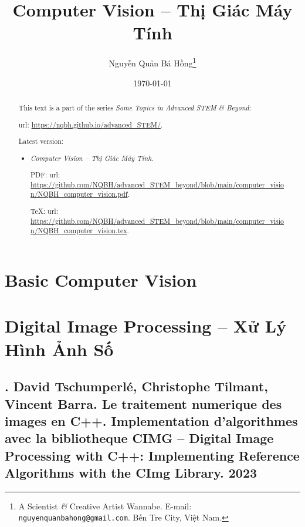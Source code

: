 \documentclass{article}
\title{Computer Vision -- Thị Giác Máy Tính}
\author{Nguyễn Quản Bá Hồng\footnote{A Scientist {\it\&} Creative Artist Wannabe. E-mail: {\tt nguyenquanbahong@gmail.com}. Bến Tre City, Việt Nam.}}
\date{\today}
\begin{document}
\maketitle
\begin{abstract}
	This text is a part of the series {\it Some Topics in Advanced STEM \& Beyond}:
	
	{\sc url}: \url{https://nqbh.github.io/advanced_STEM/}.
	
	Latest version:
	\begin{itemize}
		\item {\it Computer Vision -- Thị Giác Máy Tính}.
		
		PDF: {\sc url}: \url{https://github.com/NQBH/advanced_STEM_beyond/blob/main/computer_vision/NQBH_computer_vision.pdf}.
		
		\TeX: {\sc url}: \url{https://github.com/NQBH/advanced_STEM_beyond/blob/main/computer_vision/NQBH_computer_vision.tex}.
	\end{itemize}
\end{abstract}
\tableofcontents


\section{Basic Computer Vision}


\section{Digital Image Processing -- Xử Lý Hình Ảnh Số}

\subsection{\cite{Tschumperle_Tilmant_Barra2023}. {\sc David Tschumperl\'e, Christophe Tilmant, Vincent Barra}. Le traitement numerique des images en C++. Implementation d'algorithmes avec la bibliotheque CIMG -- Digital Image Processing with C++: Implementing Reference Algorithms with the CImg Library. 2023}
\end{document}
